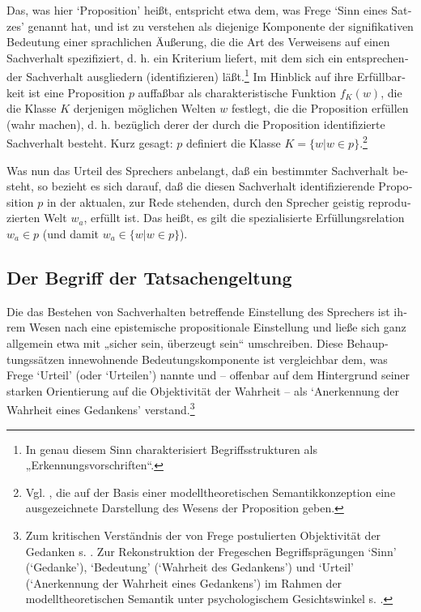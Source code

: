 \documentclass[output=paper]{langscibook}
\begin{document}
\begin{otherlanguage}{german}
Das, was hier ‘Proposition’ heißt, entspricht etwa dem, was Frege ‘Sinn eines Satzes’ genannt hat, und ist zu verstehen als diejenige Komponente der signifikativen Bedeutung einer sprachlichen Äußerung, die die Art des Verweisens auf einen Sachverhalt spezifiziert, d. h. ein Kriterium liefert, mit dem sich ein ent\-spre\-chen\-der Sachverhalt ausgliedern (identifizieren) läßt.\footnote{In genau diesem Sinn charakterisiert \citet[618]{klix1971information-und-verhalten} Begriffsstrukturen als „Erkennungsvorschriften“.} Im Hinblick auf ihre Erfüllbarkeit ist eine Proposition $p$ auffaßbar als charakteristische Funktion $f_{K}(w)$, die die Klasse $K$ derjenigen möglichen Welten $w$ festlegt, die die Proposition erfüllen (wahr machen), d. h. bezüglich derer der durch die Proposition identifizierte Sachverhalt besteht. Kurz gesagt: $p$ definiert die Klasse $K = \{w|w \in p\}$.\footnote{Vgl. \citet{Materna76Propozice}, die auf der Basis einer modelltheoretischen Semantikkonzeption eine aus\-ge\-zei\-chne\-te Darstellung des Wesens der Proposition geben.}

Was nun das Urteil des Sprechers anbelangt, daß ein bestimmter Sachverhalt besteht, so bezieht es sich darauf, daß die diesen Sachverhalt identifizierende Proposition $p$ in der aktualen, zur Rede stehenden, durch den Sprecher geistig reproduzierten Welt $w_{a}$, erfüllt ist. Das heißt, es gilt die spezialisierte Erfüllungsrelation $w_{a} \in p$ (und damit $w_{a} \in \{w|w \in p\}$).


\subsection{Der Begriff der Tatsachengeltung}\label{sec:zi83:3.3}

Die das Bestehen von Sachverhalten betreffende Einstellung des Sprechers ist ihrem Wesen nach eine epistemische propositionale Einstellung und ließe sich ganz allgemein etwa mit „sicher sein, überzeugt sein“ umschreiben. Diese Behauptungssätzen innewohnende Bedeutungskomponente ist vergleichbar dem, was Frege ‘Urteil’ (oder ‘Urteilen’) nannte und -- offenbar auf dem Hintergrund seiner starken Orientierung auf die Objektivität der Wahrheit -- als ‘Anerkennung der Wahrheit eines Gedankens’ verstand.\footnote{Zum kritischen Verständnis der von Frege postulierten Objektivität der Gedanken s. \citet[XXII ff.]{kreiser1973geschichte-und-logisch-semantische-probleme-des-wissenschaftlichen-werkes-freges}. Zur Rekonstruktion der Fregeschen Begriffsprägungen ‘Sinn’ (‘Gedanke’), ‘Bedeutung’ (‘Wahrheit des Gedankens’) und ‘Urteil’ (‘Anerkennung der Wahrheit eines Gedankens’) im Rahmen der modelltheoretischen Semantik unter psychologischem Gesichtswinkel s. \citet{bierwisch1979satztyp-und-kognitive-einstellung, bierwisch1974utterance-meaning-and-mental-states}.}


\end{otherlanguage}
\end{document}
